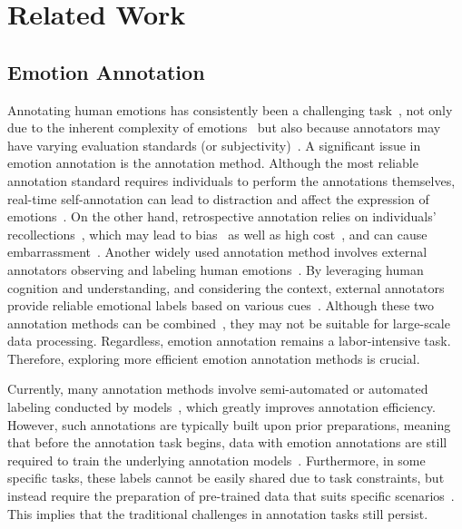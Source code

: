 \section{Related Work}
\subsection{Emotion Annotation}

Annotating human emotions has consistently been a challenging task~\cite{8764449}, not only due to the inherent complexity of emotions~\cite{5771357} but also because annotators may have varying evaluation standards (or subjectivity)~\cite{10416364,10150364}. A significant issue in emotion annotation is the annotation method. Although the most reliable annotation standard requires individuals to perform the annotations themselves, real-time self-annotation can lead to distraction and affect the expression of emotions~\cite{devillers2005challenges}. On the other hand, retrospective annotation relies on individuals' recollections~\cite{10.1145/2971485.2971516,7160695}, which may lead to bias~\cite{hoelzemann2024matter} as well as high cost~\cite{10.1145/3491102.3517453}, and can cause embarrassment~\cite{afzal2011natural}. Another widely used annotation method involves external annotators observing and labeling human emotions~\cite{8854185}. By leveraging human cognition and understanding, and considering the context, external annotators provide reliable emotional labels based on various cues~\cite{troiano2023dimensional}. Although these two annotation methods can be combined~\cite{10494076}, they may not be suitable for large-scale data processing. Regardless, emotion annotation remains a labor-intensive task. Therefore, exploring more efficient emotion annotation methods is crucial.

Currently, many annotation methods involve semi-automated or automated labeling conducted by models~\cite{10253654,10701433,10.1145/2912147,7112127,sharma2020automated,devillers2005challenges,9158345}, which greatly improves annotation efficiency. However, such annotations are typically built upon prior preparations, meaning that before the annotation task begins, data with emotion annotations are still required to train the underlying annotation models~\cite{you2016building}. Furthermore, in some specific tasks, these labels cannot be easily shared due to task constraints, but instead require the preparation of pre-trained data that suits specific scenarios~\cite{nimmi2022pre}. This implies that the traditional challenges in annotation tasks still persist.

